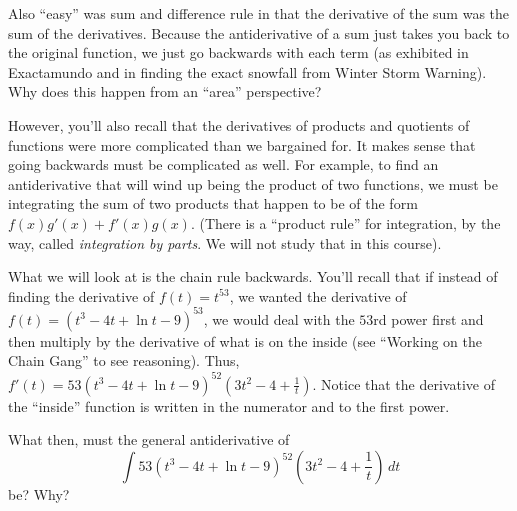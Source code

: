 \documentclass{ximera}
\begin{document}
Also ``easy'' was sum and difference rule in that the derivative of the sum was the sum of the derivatives.  Because the antiderivative of a sum just takes you back to the original function, we just go backwards with each term (as exhibited in Exactamundo and in finding the exact snowfall from Winter Storm Warning).  Why does this happen from an ``area'' perspective?

However, you'll also recall that the derivatives of products and quotients of functions were more complicated than we bargained for.  It makes sense that going backwards must be complicated as well.  For example, to find an antiderivative that will wind up being the product of two functions, we must be integrating the sum of two products that happen to be of the form $f(x) g'(x) + f'(x) g(x)$.  (There is a ``product rule'' for integration, by the way, called {\em integration by parts}.  We will not study that in this course).

 What we will look at is the chain rule backwards.  You’ll recall that if instead of finding the derivative of  $f(t) = t^{53}$, we wanted the derivative of  $f(t) = (t^3 - 4t + \ln t -9)^{53}$, we would deal with the $53$rd power first and then multiply by the derivative of what is on the inside (see ``Working on the Chain Gang'' to see reasoning).  Thus,  $f'(t) = 53(t^3-4t+\ln t -9)^{52} \left (3t^2 - 4 + \frac{1}{t} \right )$.  Notice that the derivative of the ``inside'' function is written in the numerator and to the first power.

What then, must the general antiderivative of \[\int 53(t^3-4t+\ln t -9)^{52} \left (3t^2 - 4 + \frac{1}{t} \right )\, dt\] be?  Why?
\end{document}
